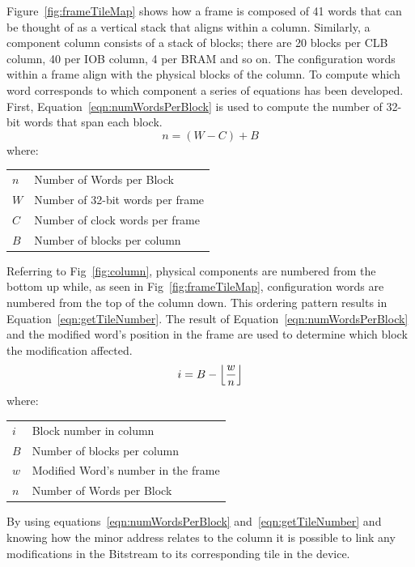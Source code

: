 \documentclass[conference]{IEEEtran}
\makeatletter
\newcommand{\ConditionSize}{\footnotesize}
\DeclarePairedDelimiter\floor{\lfloor}{\rfloor}
\newenvironment{conditions}
{\par\vspace{\abovedisplayskip}\noindent\begin{tabular}{>{$}l<{$} @{${}={}$} l}}
	{\end{tabular}\par\vspace{\belowdisplayskip}}
\makeatother
\begin{document}
Figure~\ref{fig:frameTileMap} shows how a frame is composed of 41 words that can be thought of as a vertical stack that aligns within a column.
Similarly, a component column consists of a stack of blocks; there are 20 blocks per \acrshort{CLB} column, 40 per \acrshort{IOB} column, 4 per \acrshort{BRAM} and so on.
The configuration words within a frame align with the physical blocks of the column.
To compute which word corresponds to which component a series of equations has been developed.
First, Equation~\ref{eqn:numWordsPerBlock} is used to compute the number of 32-bit words that span each block.
\begin{equation} \label{eqn:numWordsPerBlock}
n = (W - C) + B
\end{equation}
where:
\begin{conditions}
	n     &  Number of Words per Block \\
	W     &  Number of 32-bit words per frame \\   
	C     &  Number of clock words per frame \\
	B     &  Number of blocks per column
\end{conditions}
Referring to Fig~\ref{fig:column}, physical components are numbered from the bottom up while, as seen in Fig~\ref{fig:frameTileMap}, configuration words are numbered from the top of the column down.
This ordering pattern results in Equation~\ref{eqn:getTileNumber}.
The result of Equation~\ref{eqn:numWordsPerBlock} and the modified word's position in the frame are used to determine which block the modification affected.
\begin{equation} \label{eqn:getTileNumber}
i = B - \floor*{\frac{w}{n}}
\end{equation}
where:
\begin{conditions}
	i     &  Block number in column\\
	B     &  Number of blocks per column \\
	w     &  Modified Word's number in the frame\\
	n     &  Number of Words per Block 
\end{conditions}
By using equations~\ref{eqn:numWordsPerBlock} and~\ref{eqn:getTileNumber} and knowing how the minor address relates to the column it is possible to link any modifications in the \gls{Bitstream} to its corresponding tile in the device.

\end{document}
